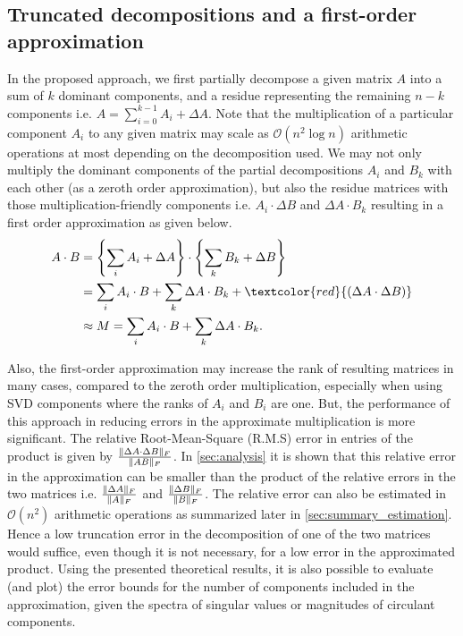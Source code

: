 \documentclass[onefignum,onetabnum]{siamart171218}
\DeclarePairedDelimiter\norm{\lVert}{\rVert}
\begin{document}
\subsection{Truncated decompositions and a first-order approximation}
In the proposed approach, we first partially decompose a given matrix $A$ into a sum of $k$ dominant components, and a residue representing the remaining $n-k$ components i.e. $A=\sum_{i=0}^{k-1} A_i + \Delta A$.  Note that the multiplication of a particular component $A_i$ to any given matrix may scale as $\mathcal{O}(n^2 \log n)$ arithmetic operations at most depending on the decomposition used. We may not only multiply the dominant components of the partial decompositions $A_i$ and $B_k$ with each other (as a zeroth order approximation), but also the residue matrices with those multiplication-friendly components i.e. $A_i \cdot \Delta B$ and $\Delta A \cdot B_k$ resulting in a first order approximation as given below.
\begin{align}
    A \cdot B  &= \left\{\sum_i A_i + \Delta A\right\} \cdot \left\{\sum_k B_k + \Delta B\right\} \\
    &= \sum_i A_i \cdot B+ \sum_k \Delta A \cdot B_k+\textcolor{red}{(\Delta A \cdot \Delta B)} \\
    &\approx M = \sum_i A_i \cdot B+ \sum_k \Delta A \cdot B_k.
\label{eq:first_order_expansion}
\end{align}

Also, the first-order approximation may increase the rank of resulting matrices in many cases, compared to the zeroth order multiplication, especially when using SVD components where the ranks of $A_i$ and $B_i$ are one. But, the performance of this approach in reducing errors in the approximate multiplication is more significant. The relative Root-Mean-Square (R.M.S) error in entries of the product is given by $\frac{\norm{\Delta A \cdot \Delta B}_F}{\norm{AB}_F}$. In \cref{sec:analysis} it is shown that this relative error in the approximation can be smaller than the product of the relative errors in the two matrices i.e. $\frac{\norm{\Delta A}_F}{\norm{A}_F}$ and $\frac{\norm{\Delta B}_F}{\norm{B}_F}$. The relative error can also be estimated in $\mathcal{O}(n^2)$ arithmetic operations as summarized later in \cref{sec:summary_estimation}. Hence a low truncation error in the decomposition of one of the two matrices would suffice, even though it is not necessary, for a low error in the approximated product. Using the presented theoretical results, it is also possible to evaluate (and plot) the error bounds for the number of components included in the approximation, given the spectra of singular values or magnitudes of circulant components.
\end{document}

